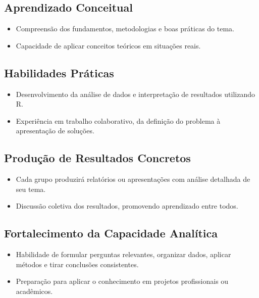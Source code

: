 \documentclass[
  letterpaper,
  DIV=11,
  numbers=noendperiod]{scrreprt}
\providecommand{\tightlist}{%
  \setlength{\itemsep}{0pt}\setlength{\parskip}{0pt}}
\begin{document}
\subsection{Aprendizado Conceitual}\label{aprendizado-conceitual}

\begin{itemize}
\tightlist
\item
  Compreensão dos fundamentos, metodologias e boas práticas do tema.\\
\item
  Capacidade de aplicar conceitos teóricos em situações reais.
\end{itemize}

\subsection{Habilidades Práticas}\label{habilidades-pruxe1ticas}

\begin{itemize}
\tightlist
\item
  Desenvolvimento da análise de dados e interpretação de resultados
  utilizando R.\\
\item
  Experiência em trabalho colaborativo, da definição do problema à
  apresentação de soluções.
\end{itemize}

\subsection{Produção de Resultados
Concretos}\label{produuxe7uxe3o-de-resultados-concretos}

\begin{itemize}
\tightlist
\item
  Cada grupo produzirá relatórios ou apresentações com análise detalhada
  de seu tema.\\
\item
  Discussão coletiva dos resultados, promovendo aprendizado entre todos.
\end{itemize}

\subsection{Fortalecimento da Capacidade
Analítica}\label{fortalecimento-da-capacidade-analuxedtica}

\begin{itemize}
\tightlist
\item
  Habilidade de formular perguntas relevantes, organizar dados, aplicar
  métodos e tirar conclusões consistentes.\\
\item
  Preparação para aplicar o conhecimento em projetos profissionais ou
  acadêmicos.
\end{itemize}
\end{document}
